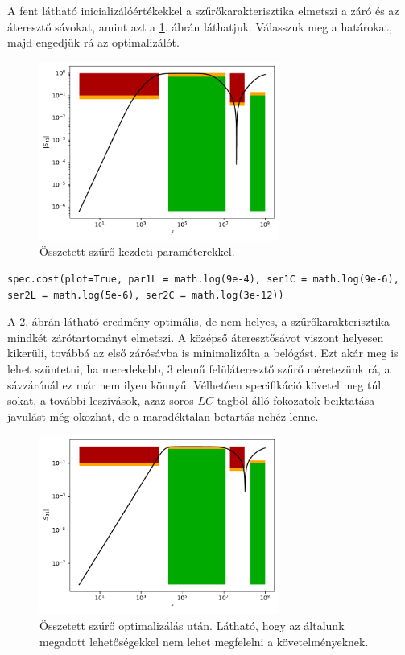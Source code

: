         A fent látható inicializálóértékekkel a szűrőkarakterisztika elmetszi a záró és az áteresztő sávokat, amint azt a \ref{fig:bonyi}. ábrán láthatjuk. Válasszuk meg a határokat, majd engedjük rá az optimalizálót.
        \begin{figure}[h!]
            \centering
            \includegraphics[width=0.7\textwidth]{bonyi.pdf}
            \caption{Összetett szűrő kezdeti paraméterekkel.}
            \label{fig:bonyi}
        \end{figure}
       	\begin{lstlisting}
spec.cost(plot=True, par1L = math.log(9e-4), ser1C = math.log(9e-6), ser2L = math.log(5e-6), ser2C = math.log(3e-12))
        \end{lstlisting}
        A \ref{fig:bonyi_subopt}. ábrán látható eredmény optimális, de nem helyes, a szűrőkarakterisztika mindkét zárótartományt elmetszi. A középső áteresztősávot viszont helyesen kikerüli, továbbá az első zárósávba is minimalizálta a belógást. Ezt akár meg is lehet szüntetni, ha meredekebb, 3 elemű felüláteresztő szűrő méretezünk rá, a sávzárónál ez már nem ilyen könnyű. Vélhetően specifikáció követel meg túl sokat, a további leszívások, azaz soros $LC$ tagból álló fokozatok beiktatása javulást még okozhat, de a maradéktalan betartás nehéz lenne.
        \begin{figure}[h!]
            \centering
            \includegraphics[width=0.7\textwidth]{bonyi_subopt.pdf}
            \caption{Összetett szűrő optimalizálás után. Látható, hogy az általunk megadott lehetőségekkel nem lehet megfelelni a követelményeknek.}
            \label{fig:bonyi_subopt}
        \end{figure}
        
